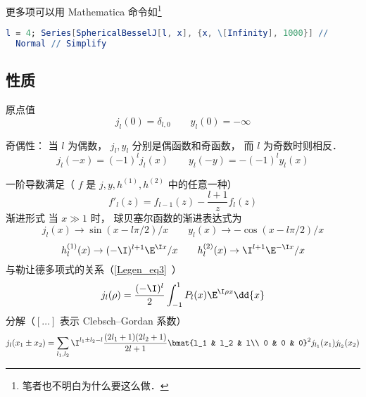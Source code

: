 更多项可以用 Mathematica 命令如\footnote{笔者也不明白为什么要这么做．}
\begin{lstlisting}[language=Mathematica]
l = 4; Series[SphericalBesselJ[l, x], {x, \[Infinity], 1000}] // 
  Normal // Simplify
\end{lstlisting}

\subsection{性质}
原点值
\begin{equation}
j_l(0) = \delta_{l,0} \qquad y_l(0) = -\infty
\end{equation}

奇偶性： 当 $l$ 为偶数， $j_l, y_l$ 分别是偶函数和奇函数， 而 $l$ 为奇数时则相反．
\begin{equation}\label{SphBsl_eq3}
j_l(-x) = (-1)^l j_l(x)
\qquad
y_l(-y) = -(-1)^l y_l(x)
\end{equation}

一阶导数满足（ $f$ 是 $j, y, h^{(1)}, h^{(2)}$ 中的任意一种）
\begin{equation}
f'_l(z) = f_{l-1}(z) - \frac{l+1}{z} f_l(z)
\end{equation}
渐进形式
当 $x \gg 1$ 时， 球贝塞尔函数的渐进表达式为
\begin{equation}\label{SphBsl_eq2}
j_l(x) \to \sin(x - l\pi /2)/x
\qquad
y_l(x) \to  - \cos(x - l\pi /2)/x
\end{equation}
\begin{equation}
h_l^{(1)}(x) \to ( -\I)^{l+1} \E^{\I x}/x
\qquad
h_l^{(2)}(x) \to \I^{l + 1} \E^{-\I x}/x
\end{equation}
与勒让德多项式的关系（\autoref{Legen_eq3}~）
\begin{equation}
j_l(\rho) = \frac{(-\I)^l}{2} \int_{-1}^1 P_l(x) \E^{\I \rho x} \dd{x}
\end{equation}
分解（$[\dots]$ 表示 Clebsch–Gordan 系数）
\begin{equation}
j_l(x_1 \pm x_2) = \sum_{l_1,l_2} \I^{l_1\pm l_2-l} \frac{(2l_1+1)(2l_2+1)}{2l+1}
\bmat{l_1 & l_2 & l\\ 0 & 0 & 0}^2 j_{l_1}(x_1) j_{l_2}(x_2)
\end{equation}

